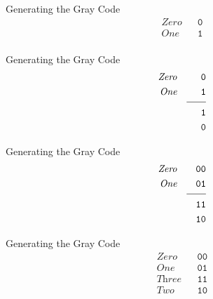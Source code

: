 \documentclass[aspectratio=169]{beamer}
\begin{document}
\begin{frame}{Generating the Gray Code}
    \begin{align*}
        \textit{Zero}& &\texttt{0}  \\
        \textit{One}&  &\texttt{1}  \\
    \end{align*}
\end{frame}

\begin{frame}{Generating the Gray Code}
    \begin{align*}
        \textit{Zero}& &\texttt{0}  \\
        \textit{One}&  &\texttt{1}  \\[-3\jot]
        &   &\underline{\hspace{20pt}}\\
                    &  &\texttt{1}  \\
                    &  &\texttt{0}  \\
    \end{align*}
\end{frame}

\begin{frame}{Generating the Gray Code}
    \begin{align*}
        \textit{Zero}& &\texttt{00}  \\
        \textit{One}&  &\texttt{01}  \\[-3\jot]
        &   &\underline{\hspace{20pt}}\\
                    &  &\texttt{11}  \\
                    &  &\texttt{10}  \\
    \end{align*}
\end{frame}

\begin{frame}{Generating the Gray Code}
    \begin{align*}
        \textit{Zero}& &\texttt{00}  \\
        \textit{One}&  &\texttt{01}  \\
        \textit{Three} &  &\texttt{11}  \\
        \textit{Two} &  &\texttt{10}  \\
    \end{align*}
\end{frame}
\end{document}
